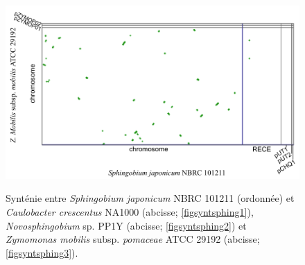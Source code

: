 \begin{figure}[H]
\begin{center}
\begin{minipage}{0.49\textwidth}
	\label{figsyntsphing2}
	\end{minipage}

	\begin{minipage}{0.7\textwidth}
	\includegraphics[width=\textwidth]{./img/synteny/new/fig8_6c.png}
	\label{figsyntsphing3}
	\end{minipage}

\caption[Synténie de \textit{Sphingobium} \textit{vs.}  Caulobacteraceae et autres Sphingomonadaceae]{Synténie entre \textit{Sphingobium japonicum} NBRC 101211 (ordonnée) et \textit{Caulobacter crescentus} NA1000 (abcisse; \ref{figsyntsphing1}), \textit{Novosphingobium} sp. PP1Y (abcisse; \ref{figsyntsphing2}) et \textit{Zymomonas mobilis} subsp. \textit{pomaceae} ATCC 29192 (abcisse; \ref{figsyntsphing3}).}\label{figsyntsphing}
\end{center}
\end{figure} 

